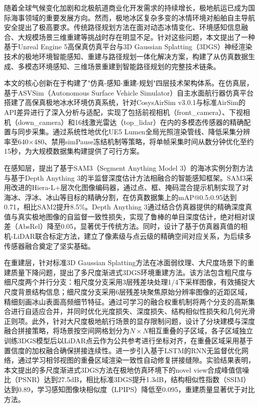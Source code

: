 \documentclass[12pt,a4paper]{ctexbook}
\begin{document}
随着全球气候变化加剧和北极航道商业化开发需求的持续增长，极地航运已成为国际海事领域的重要发展方向。然而，极地冰区复杂多变的冰情环境对船舶自主导航安全提出了极高要求。传统路径规划方法在面对动态冰情变化、环境感知信息融合、大规模场景三维重建等挑战时存在明显不足。针对这些问题，本文提出了一种基于Unreal Engine 5高保真仿真平台与3D Gaussian Splatting（3DGS）神经渲染技术的极地环境智能感知、重建与路径规划一体化解决方案，构建了从仿真数据生成、多模态环境感知、三维场景重建到智能路径规划的完整技术链条。

本文的核心创新在于构建了"仿真-感知-重建-规划"四层技术架构体系。在仿真层，基于ASVSim（Autonomous Surface Vehicle Simulator）自主水面航行器仿真平台搭建了高保真极地冰水环境仿真系统，针对CosysAirSim v3.0.1与标准AirSim的API差异进行了深入分析与适配，实现了包括前视相机（front\_camera）、下视相机（down\_camera）和16线激光雷达（top\_lidar）在内的多模态传感器的精确配置与同步采集。通过系统性地优化UE5 Lumen全局光照渲染管线、降低采集分辨率至640×480、禁用simPause冻结机制等策略，将单帧采集时间从数分钟优化至约15秒，为大规模数据集构建提供了可行方案。

在感知层，提出了基于SAM3（Segment Anything Model 3）的海冰实例分割方法与基于Depth Anything 3的半监督深度估计方法相融合的智能感知框架。SAM3采用改进的Hiera-L+层次化图像编码器，通过点、框、掩码混合提示机制实现了对海冰、浮冰、冰山等目标的精确分割，在仿真数据集上的mAP@0.5:0.95达到0.71，相比SAM2提升8.5\%。Depth Anything 3通过结合仿真器提供的精确深度真值与真实极地图像的自监督一致性损失，实现了鲁棒的单目深度估计，绝对相对误差（AbsRel）降至0.05，显著优于传统方法。同时，设计了基于仿真器真值的相机-LiDAR联合标定方法，建立了像素级与点云级的精确空间对应关系，为后续多传感器融合奠定了坚实基础。

在重建层，针对标准3D Gaussian Splatting方法在冰面弱纹理、大尺度场景下的重建质量下降问题，提出了多尺度渐进式3DGS环境重建方法。该方法包含粗尺度与细尺度两个并行分支：粗尺度分支采用3层残差块处理1/4下采样图像，有效捕捉大尺度背景结构信息；细尺度分支采用6层残差块聚焦原始分辨率图像的近距区域，精细刻画冰山表面高频细节特征。通过可学习的融合权重机制将两个分支的高斯集合进行自适应合并，并同时优化光度损失、深度损失、结构相似性损失和几何光滑正则项。此外，针对大尺度极地航行场景的显存限制问题，设计了分块建模与深度融合拼接策略，将场景按空间网格划分为$N \times N$相互重叠的子区域，各子区域独立训练3DGS模型后以LiDAR点云作为公共参考进行坐标对齐，在重叠区域采用基于置信度的加权融合确保拼接连续性。进一步引入基于LSTM的RNN无监督优化网络，通过学习相邻视图的重叠区域渲染一致性自动修复拼接缝隙。实验结果表明，本文提出的多尺度渐进式3DGS方法在极地仿真环境下的novel view合成峰值信噪比（PSNR）达到27.5dB，相比标准3DGS提升1.3dB，结构相似性指数（SSIM）达到0.89，学习感知图像块相似度（LPIPS）降低至0.095，重建质量显著优于对比方法。
\end{document}
